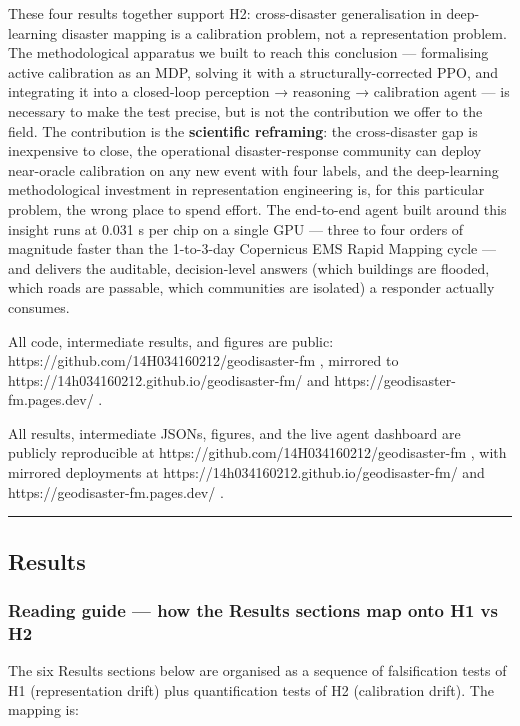 These four results together support H2: cross-disaster generalisation
in deep-learning disaster mapping is a calibration problem, not a
representation problem. The methodological apparatus we built to reach
this conclusion --- formalising active calibration as an MDP, solving it
with a structurally-corrected PPO, and integrating it into a closed-loop
perception → reasoning → calibration agent --- is necessary to make the
test precise, but is not the contribution we offer to the field. The
contribution is the \textbf{scientific reframing}: the cross-disaster gap is
inexpensive to close, the operational disaster-response community can
deploy near-oracle calibration on any new event with four labels, and
the deep-learning methodological investment in representation
engineering is, for this particular problem, the wrong place to spend
effort. The end-to-end agent built around this insight runs at 0.031 s
per chip on a single GPU --- three to four orders of magnitude faster
than the 1-to-3-day Copernicus EMS Rapid Mapping cycle --- and delivers
the auditable, decision-level answers (which buildings are flooded,
which roads are passable, which communities are isolated) a responder
actually consumes.

All code, intermediate results, and figures are public:
https://github.com/14H034160212/geodisaster-fm , mirrored to
https://14h034160212.github.io/geodisaster-fm/ and
https://geodisaster-fm.pages.dev/ .

All results, intermediate JSONs, figures, and the live agent dashboard are
publicly reproducible at https://github.com/14H034160212/geodisaster-fm , with
mirrored deployments at https://14h034160212.github.io/geodisaster-fm/ and
https://geodisaster-fm.pages.dev/ .

\begin{center}\rule{0.5\linewidth}{0.5pt}\end{center}

\subsection{Results}\label{results}

\subsubsection{Reading guide --- how the Results sections map onto H1 vs H2}\label{reading-guide-how-the-results-sections-map-onto-h1-vs-h2}

The six Results sections below are organised as a sequence of
falsification tests of H1 (representation drift) plus quantification
tests of H2 (calibration drift). The mapping is:

